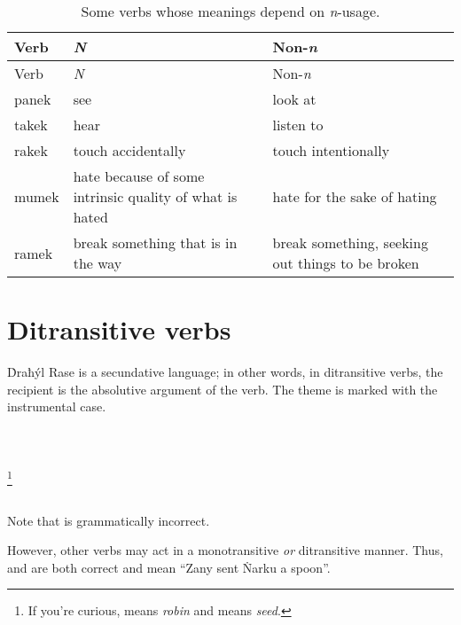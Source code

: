 \documentclass{book}
\begin{document}
\begin{longtabu} to \linewidth {|l|Y|Y|}
    \caption{Some verbs whose meanings depend on \emph{n}-usage.} \\
    
    \hline
    Verb & \emph{N} & Non-\emph{n} \\
    \hline
    \endfirsthead
    
    \hline
    Verb & \emph{N} & Non-\emph{n} \\
    \hline
    \endhead
    
    \hline
    \endfoot
    
    \hline
    \endlastfoot
    
    panek & see & look at \\
    takek & hear & listen to \\
    rakek & touch accidentally & touch intentionally \\
    mumek & hate because of some intrinsic quality of what is hated & hate for the sake of hating \\
    ramek & break something that is in the way & break something, seeking out things to be broken \\
\end{longtabu}

\section{Ditransitive verbs}

Ḋraħýl Rase is a secundative language; in other words, in ditransitive verbs, the recipient is the absolutive argument of the verb. The theme is marked with the instrumental case. \\
~\\
    \\
    \\
\emph{   }\footnote{If you're curious,  means \emph{robin} and  means \emph{seed}.} \\
~

Note that  is grammatically incorrect.

However, other verbs may act in a monotransitive \emph{or} ditransitive manner. Thus,  and  are both correct and mean ``Zany sent Ṅarku a spoon''.
\end{document}
